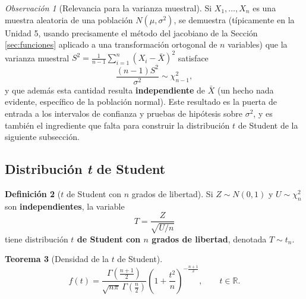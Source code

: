 \documentclass[11pt,a4paper]{article}
\theoremstyle{plain}
\newtheorem{teorema}{Teorema}[section]
\theoremstyle{definition}
\newtheorem{definicion}[teorema]{Definición}
\theoremstyle{remark}
\newtheorem{observacion}[teorema]{Observación}
\begin{document}
\begin{observacion}[Relevancia para la varianza muestral]
Si $X_1,\dots,X_n$ es una muestra aleatoria de una población $N(\mu,\sigma^2)$, se demuestra (típicamente en la Unidad 5, usando precisamente el método del jacobiano de la Sección \ref{sec:funciones} aplicado a una transformación ortogonal de $n$ variables) que la varianza muestral $S^2 = \tfrac{1}{n-1}\sum_{i=1}^n(X_i-\bar X)^2$ satisface
\[
\frac{(n-1)S^2}{\sigma^2} \sim \chi_{n-1}^2,
\]
y que además esta cantidad resulta \textbf{independiente} de $\bar X$ (un hecho nada evidente, específico de la población normal). Este resultado es la puerta de entrada a los intervalos de confianza y pruebas de hipótesis sobre $\sigma^2$, y es también el ingrediente que falta para construir la distribución $t$ de Student de la siguiente subsección.
\end{observacion}

\subsection{Distribución \emph{t} de Student}

\begin{definicion}[$t$ de Student con $n$ grados de libertad]
Si $Z\sim N(0,1)$ y $U\sim\chi_n^2$ son \textbf{independientes}, la variable
\[
T = \frac{Z}{\sqrt{U/n}}
\]
tiene distribución \textbf{$t$ de Student con $n$ grados de libertad}, denotada $T\sim t_n$.
\end{definicion}

\begin{teorema}[Densidad de la $t$ de Student]\label{teo:densidad-t}
\[
f(t) = \frac{\Gamma\left(\frac{n+1}{2}\right)}{\sqrt{n\pi}\,\Gamma\left(\frac n2\right)}\left(1+\frac{t^2}{n}\right)^{-\frac{n+1}{2}}, \qquad t\in\mathbb R.
\]
\end{teorema}
\end{document}
